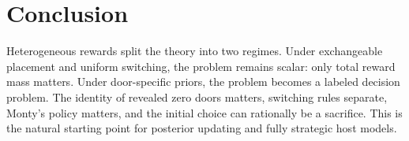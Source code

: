 \documentclass[11pt]{article}
\begin{document}
\section{Conclusion}

Heterogeneous rewards split the theory into two regimes.  Under exchangeable
placement and uniform switching, the problem remains scalar: only total reward
mass matters.  Under door-specific priors, the problem becomes a labeled
decision problem.  The identity of revealed zero doors matters, switching
rules separate, Monty's policy matters, and the initial choice can rationally
be a sacrifice.  This is the natural starting point for posterior updating and
fully strategic host models.
\end{document}

